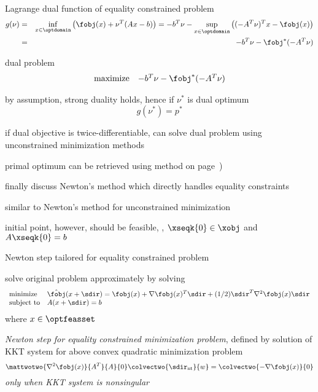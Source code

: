 \documentclass[17pt,landscape]{foils}
\begin{document}
{\bit
\item
	Lagrange dual function of equality constrained problem
	\begin{eqnarray*}
			g(\nu)
		&
		=
		&
			\inf_{x\in\optdomain}
			\left(
				\fobj(x) + \nu^T(Ax-b)
			\right)
		=
			-b^T\nu - \sup_{x\in\optdomain} \left((-A^T\nu)^Tx -\fobj(x)\right)
		\\
		&
		=
		&
			-b^T \nu - {\fobj}^\ast(-A^T\nu)
	\end{eqnarray*}

\vitem
	dual problem
	$$
		\begin{array}{ll}
			\mbox{maximize} &
				-b^T \nu - {\fobj}^\ast(-A^T\nu)
		\end{array}
	$$

\vitem
	by assumption, strong duality holds, hence
	if $\nu^\ast$ is dual optimum
	$$
		g(\nu^\ast) = p^\ast
	$$

\vitem
	if dual objective is twice-differentiable,
	can solve dual problem using unconstrained minimization methods

\vitem
	primal optimum can be retrieved using method on page~\pageref{page:Solving primal problems via dual problems})

\eit
\vfill



\bit
\item
	finally discuss Newton's method which directly handles equality constraints

	\bit
	\vitem
		similar to Newton's method for unconstrained minimization

	\vitem
		initial point, however, should be feasible, \ie, $\xseqk{0}\in\xobj$ and $A\xseqk{0} = b$

	\vitem
		Newton step tailored for equality constrained problem
	\eit
\eit
\vfill



\bit
\item
	solve original problem approximately by solving
	$$
		\begin{array}{ll}
			\mbox{minimize} &
				\hat{\fobj}(x+\sdir) = \fobj(x) + \nabla \fobj(x)^T \sdir + (1/2) \sdir^T \nabla^2 \fobj(x) \sdir
			\\
			\mbox{subject to} &
				A(x+\sdir) = b
		\end{array}
	$$
	where $x\in\optfeasset$

\vitem
	\emph{Newton step for equality constrained minimization problem},
	defined by
	solution of
	KKT system
	for above convex quadratic minimization problem
	$$
		\mattwotwo{\nabla^2 \fobj(x)}{A^T}{A}{0}
		\colvectwo{\sdir_\mathrm{nt}}{w}
		=
		\colvectwo{-\nabla \fobj(x)}{0}
	$$
	\emph{only when KKT system is nonsingular}
\eit
\vfill


}
\end{document}
